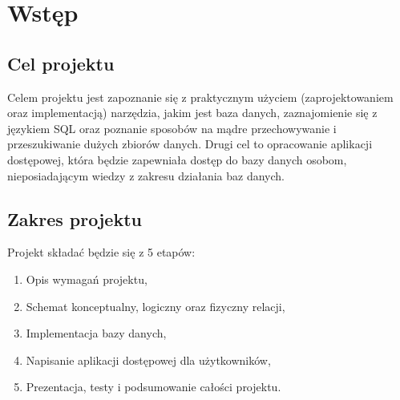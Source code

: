 \documentclass[12pt]{article}
\begin{document}
\newpage



\section{Wstęp}
\subsection{Cel projektu}
\hspace{0.5cm} Celem projektu jest zapoznanie się z praktycznym użyciem (zaprojektowaniem oraz implementacją) narzędzia, jakim jest baza danych, zaznajomienie się z językiem SQL oraz poznanie sposobów na mądre przechowywanie i przeszukiwanie dużych zbiorów danych. Drugi cel to opracowanie aplikacji dostępowej, która będzie zapewniała dostęp do bazy danych osobom, nieposiadającym wiedzy z zakresu działania baz danych.

\subsection{Zakres projektu}
\hspace{0.5cm} Projekt składać będzie się z 5 etapów:
\begin{enumerate}
    \item Opis wymagań projektu,
    \item Schemat konceptualny, logiczny oraz fizyczny relacji,
    \item Implementacja bazy danych,
    \item Napisanie aplikacji dostępowej dla użytkowników,
    \item Prezentacja, testy i podsumowanie całości projektu.
\end{enumerate}



\end{document}
